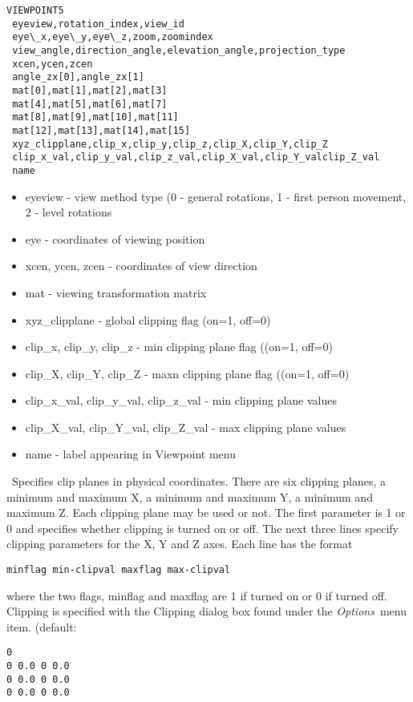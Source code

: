 \documentclass[11pt,twoside]{book}
\begin{document}
{{\small
\begin{lstlisting}
VIEWPOINT5
 eyeview,rotation_index,view_id
 eye\_x,eye\_y,eye\_z,zoom,zoomindex
 view_angle,direction_angle,elevation_angle,projection_type
 xcen,ycen,zcen
 angle_zx[0],angle_zx[1]
 mat[0],mat[1],mat[2],mat[3]
 mat[4],mat[5],mat[6],mat[7]
 mat[8],mat[9],mat[10],mat[11]
 mat[12],mat[13],mat[14],mat[15]
 xyz_clipplane,clip_x,clip_y,clip_z,clip_X,clip_Y,clip_Z
 clip_x_val,clip_y_val,clip_z_val,clip_X_val,clip_Y_valclip_Z_val
 name
\end{lstlisting}
}

\begin{itemize}
\item eyeview - view method type (0 - general rotations,
1 - first person movement, 2 - level rotations
\item eye - coordinates of viewing position
\item xcen, ycen, zcen - coordinates of view direction
\item mat - viewing transformation matrix
\item xyz\_clipplane - global clipping flag (on=1, off=0)
\item clip\_x, clip\_y, clip\_z - min clipping plane flag ((on=1, off=0)
\item clip\_X, clip\_Y, clip\_Z - maxn clipping plane flag ((on=1, off=0)
\item clip\_x\_val, clip\_y\_val, clip\_z\_val - min clipping plane values
\item clip\_X\_val, clip\_Y\_val, clip\_Z\_val - max clipping plane values
\item name - label appearing in Viewpoint menu
\end{itemize}

\ Specifies clip planes in physical
coordinates. There are six clipping planes, a minimum and
maximum X, a minimum and maximum Y, a minimum and maximum
Z. Each clipping plane may be used or not. The first
parameter is 1 or 0 and specifies whether clipping is
turned on or off. The next three lines specify clipping
parameters for the X, Y and Z axes.  Each line has the
format

\begin{lstlisting}
minflag min-clipval maxflag max-clipval
\end{lstlisting}

where the two flags, minflag and maxflag are 1 if turned on or 0
if turned off. Clipping is specified with the Clipping
dialog box found under the {\em Options}\ menu item.
 (default:
\begin{lstlisting}
0
0 0.0 0 0.0
0 0.0 0 0.0
0 0.0 0 0.0
\end{lstlisting}

}
\end{document}

